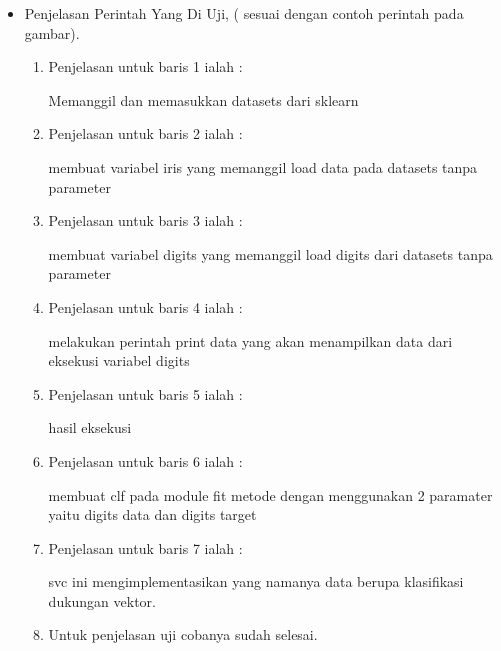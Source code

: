 \begin{itemize}
\begin{itemize}
\par
\item Penjelasan Perintah Yang Di Uji, ( sesuai dengan contoh perintah pada gambar).
\begin{enumerate}
\item Penjelasan untuk baris 1 ialah : 
\par Memanggil dan memasukkan datasets dari sklearn
\par 
\par
\item Penjelasan untuk baris 2 ialah :
\par membuat variabel iris yang memanggil load data pada datasets tanpa parameter
\par
\item Penjelasan untuk baris 3 ialah :
\par membuat variabel digits yang memanggil load digits dari datasets tanpa parameter
\par
\item Penjelasan untuk baris 4 ialah :
\par melakukan perintah print data yang akan menampilkan data dari eksekusi variabel digits
\par
\item Penjelasan untuk baris 5 ialah :
\par hasil eksekusi
\par
\item Penjelasan untuk baris 6 ialah :
\par membuat clf pada module fit metode dengan menggunakan 2 paramater yaitu digits data dan digits target
\par
\item Penjelasan untuk baris 7 ialah :
\par svc ini mengimplementasikan yang namanya data berupa klasifikasi dukungan vektor.
\par
\item Untuk penjelasan uji cobanya sudah selesai.
\par
\end{enumerate}
\end{itemize}
\end{itemize}


